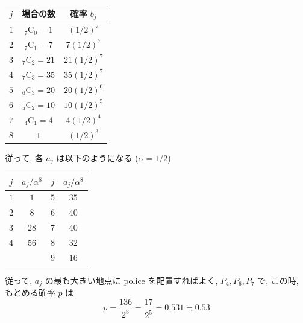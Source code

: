\documentclass[../main.tex]{subfiles}
\begin{document}
\begin{center}
  \begin{tabular}{c|c|c}
    $j$ & 場合の数 & 確率 $b_j$ \\ \hline
    $1$ & ${}_7\mathrm{C}_0 = 1$ & $(1/2)^7$ \\
    $2$ & ${}_7\mathrm{C}_1 = 7$ & $7(1/2)^7$ \\
    $3$ & ${}_7\mathrm{C}_2 = 21$ & $21(1/2)^7$ \\
    $4$ & ${}_7\mathrm{C}_3 = 35$ & $35(1/2)^7$ \\
    $5$ & ${}_6\mathrm{C}_3 = 20$ & $20(1/2)^6$ \\
    $6$ & ${}_5\mathrm{C}_2 = 10$ & $10(1/2)^5$ \\
    $7$ & ${}_4\mathrm{C}_1 = 4$ & $4(1/2)^4$ \\
    $8$ & $1$ & $(1/2)^3$
  \end{tabular}
\end{center}

従って, 各 $a_j$ は以下のようになる ($\alpha = 1/2$)

\begin{center}
  \begin{tabular}{c|c || c|c}
    $j$ & $a_j / \alpha^8$ & $j$ & $a_j / \alpha^8$ \\ \hline
    $1$ & $1$ & $5$ & $35$ \\
    $2$ & $8$ & $6$ & $40$ \\
    $3$ & $28$ & $7$ & $40$ \\
    $4$ & $56$ & $8$ & $32$ \\
    & & $9$ & $16$
  \end{tabular}
\end{center}

従って, $a_j$ の最も大きい地点に police を配置すればよく, $P_4, P_6, P_7$ で, この時, もとめる確率 $p$ は
\[
  p = \frac{136}{2^8} = \frac{17}{2^5} = 0.531 \fallingdotseq 0.53
\]
\end{document}
